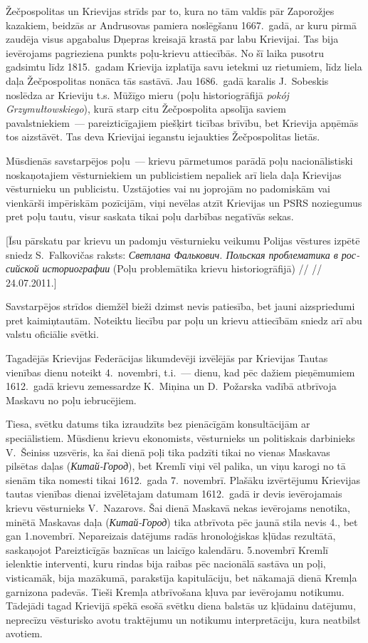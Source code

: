 \documentclass[twoside,a5paper,12pt,fleqn,openany]{extbook}
\newcommand{\pltxti}[1]{\textit{\textpolish{#1}}}
\newcommand{\rutxti}[1]{\textit{\textrussian{#1}}}
\begin{document}
Žečpospolitas un Krievijas strīds par to, kura no tām valdīs pār Zaporožjes kazakiem, beidzās ar Andrusovas pamiera noslēgšanu 1667.~gadā, ar kuru pirmā zaudēja visus apgabalus Dņepras kreisajā krastā par labu Krievijai. Tas bija ievērojams pagrieziena punkts poļu-krievu attiecībās. No šī laika pusotru gadsimtu līdz 1815.~gadam Krievija izplatīja savu ietekmi uz rietumiem, līdz liela daļa Žečpospolitas nonāca tās sastāvā. Jau 1686.~gadā karalis J.~Sobeskis noslēdza ar Krieviju t.s. Mūžīgo mieru (poļu historiogrāfijā \pltxti{pokój Grzymułtowskiego}), kurā starp citu Žečpospolita apsolīja saviem pavalstniekiem~--- pareizticīgajiem piešķirt ticības brīvību, bet Krievija apņēmās tos aizstāvēt. Tas deva Krievijai ieganstu iejaukties Žečpospolitas lietās.

Mūsdienās savstarpējos poļu~--- krievu pārmetumos parādā poļu nacionālistiski noskaņotajiem vēsturniekiem un publicistiem nepaliek arī liela daļa Krievijas vēsturnieku un publicistu. Uzstājoties vai nu joprojām no padomiskām vai vienkārši impēriskām pozīcijām, viņi nevēlas atzīt Krievijas un PSRS noziegumus pret poļu tautu, visur saskata tikai poļu darbības negatīvās sekas.

[Īsu pārskatu par krievu un padomju vēsturnieku veikumu Polijas vēstures izpētē sniedz S.~Falkovičas raksts: \rutxti{Светлана Фалькович. Польская проблематика в российской историографии} (Poļu problemātika krievu historiogrāfijā) // %
// 24.07.2011.]

Savstarpējos strīdos diemžēl bieži dzimst nevis patiesība, bet jauni aizspriedumi pret kaimiņtautām. Noteiktu liecību par poļu un krievu attiecībām sniedz arī abu valstu oficiālie svētki.

Tagadējās Krievijas Federācijas likumdevēji izvēlējās par Krievijas Tautas vienības dienu noteikt 4.~novembri, t.i.~--- dienu, kad pēc dažiem pieņēmumiem 1612.~gadā krievu zemessardze K.~Miņina un D.~Požarska vadībā atbrīvoja Maskavu no poļu iebrucējiem.

Tiesa, svētku datums tika izraudzīts bez pienācīgām konsultācijām ar speciālistiem. Mūsdienu krievu ekonomists, vēsturnieks un politiskais darbinieks V.~Šeiniss uzsvēris, ka šai dienā poļi tika padzīti tikai no vienas Maskavas pilsētas daļas (\rutxti{Китай-Город}), bet Kremlī viņi vēl palika, un viņu karogi no tā sienām tika nomesti tikai 1612.~gada 7.~novembrī. Plašāku izvērtējumu Krievijas tautas vienības dienai izvēlētajam datumam 1612.~gadā ir devis ievērojamais krievu vēsturnieks V.~Nazarovs. Šai dienā Maskavā nekas ievērojams nenotika, minētā Maskavas daļa (\rutxti{Китай-Город}) tika atbrīvota pēc jaunā stila nevis 4., bet gan 1.novembrī. Nepareizais datējums radās hronoloģiskas kļūdas rezultātā, saskaņojot Pareizticīgās baznīcas un laicīgo kalendāru. 5.novembrī Kremlī ielenktie interventi, kuru rindas bija raibas pēc nacionālā sastāva un poļi, visticamāk, bija mazākumā, parakstīja kapitulāciju, bet nākamajā dienā Kremļa garnizona padevās. Tieši Kremļa atbrīvošana kļuva par ievērojamu notikumu. Tādejādi tagad Krievijā spēkā esošā svētku diena balstās uz kļūdainu datējumu, neprecīzu vēsturisko avotu traktējumu un notikumu interpretāciju, kura neatbilst avotiem.
\end{document}
